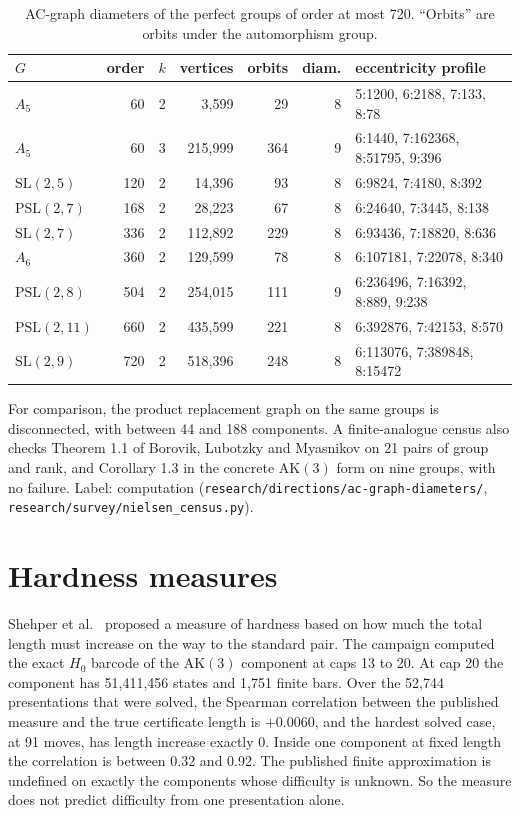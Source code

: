 \documentclass[11pt,a4paper]{article}
\theoremstyle{definition}
\newcommand{\AK}{\mathrm{AK}}
\begin{document}
\begin{table}[h]
\centering
\small
\begin{tabular}{lrrrrrl}
\toprule
$G$ & order & $k$ & vertices & orbits & diam. & eccentricity profile \\
\midrule
$A_5$ & 60 & 2 & 3,599 & 29 & 8 & 5:1200, 6:2188, 7:133, 8:78 \\
$A_5$ & 60 & 3 & 215,999 & 364 & 9 & 6:1440, 7:162368, 8:51795, 9:396 \\
$\mathrm{SL}(2,5)$ & 120 & 2 & 14,396 & 93 & 8 & 6:9824, 7:4180, 8:392 \\
$\mathrm{PSL}(2,7)$ & 168 & 2 & 28,223 & 67 & 8 & 6:24640, 7:3445, 8:138 \\
$\mathrm{SL}(2,7)$ & 336 & 2 & 112,892 & 229 & 8 & 6:93436, 7:18820, 8:636 \\
$A_6$ & 360 & 2 & 129,599 & 78 & 8 & 6:107181, 7:22078, 8:340 \\
$\mathrm{PSL}(2,8)$ & 504 & 2 & 254,015 & 111 & 9 & 6:236496, 7:16392, 8:889, 9:238 \\
$\mathrm{PSL}(2,11)$ & 660 & 2 & 435,599 & 221 & 8 & 6:392876, 7:42153, 8:570 \\
$\mathrm{SL}(2,9)$ & 720 & 2 & 518,396 & 248 & 8 & 6:113076, 7:389848, 8:15472 \\
\bottomrule
\end{tabular}
\caption{AC-graph diameters of the perfect groups of order at most 720. ``Orbits'' are orbits under the automorphism group.}
\label{tab:diam}
\end{table}

For comparison, the product replacement graph on the same groups is disconnected, with between 44 and 188 components. A finite-analogue census also checks Theorem 1.1 of Borovik, Lubotzky and Myasnikov on 21 pairs of group and rank, and Corollary 1.3 in the concrete $\AK(3)$ form on nine groups, with no failure. Label: computation (\texttt{research/directions/ac-graph-diameters/}, \texttt{research/survey/nielsen\_census.py}).

\section{Hardness measures}\label{sec:hardness}

Shehper et al.\ \cite{SMF25} proposed a measure of hardness based on how much the total length must increase on the way to the standard pair. The campaign computed the exact $H_0$ barcode of the $\AK(3)$ component at caps 13 to 20. At cap 20 the component has 51,411,456 states and 1,751 finite bars. Over the 52,744 presentations that were solved, the Spearman correlation between the published measure and the true certificate length is $+0.0060$, and the hardest solved case, at 91 moves, has length increase exactly 0. Inside one component at fixed length the correlation is between 0.32 and 0.92. The published finite approximation is undefined on exactly the components whose difficulty is unknown. So the measure does not predict difficulty from one presentation alone.
\end{document}
